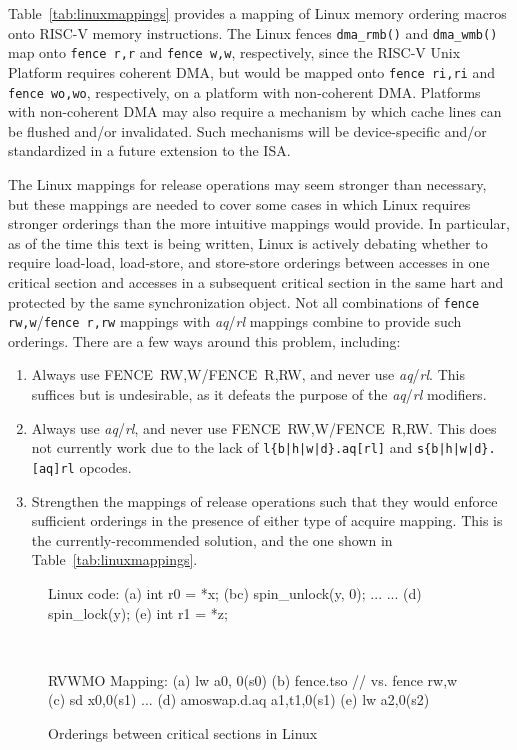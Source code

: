Table~\ref{tab:linuxmappings} provides a mapping of Linux memory ordering macros onto RISC-V memory instructions.
The Linux fences {\tt dma\_rmb()} and {\tt dma\_wmb()} map onto {\tt fence r,r} and {\tt fence w,w}, respectively, since the RISC-V Unix Platform requires coherent DMA, but would be mapped onto {\tt fence ri,ri} and {\tt fence wo,wo}, respectively, on a platform with non-coherent DMA.
Platforms with non-coherent DMA may also require a mechanism by which cache lines can be flushed and/or invalidated.
Such mechanisms will be device-specific and/or standardized in a future extension to the ISA.

The Linux mappings for release operations may seem stronger than necessary, but these mappings are needed to cover some cases in which Linux requires stronger orderings than the more intuitive mappings would provide.
In particular, as of the time this text is being written, Linux is actively debating whether to require load-load, load-store, and store-store orderings between accesses in one critical section and accesses in a subsequent critical section in the same hart and protected by the same synchronization object.
Not all combinations of {\tt fence rw,w}/{\tt fence r,rw} mappings with {\em aq}/{\em rl} mappings combine to provide such orderings.
There are a few ways around this problem, including:
\begin{enumerate}
  \item Always use FENCE~RW,W/FENCE~R,RW, and never use {\em aq}/{\em rl}.  This suffices but is undesirable, as it defeats the purpose of the {\em aq}/{\em rl} modifiers.
  \item Always use {\em aq}/{\em rl}, and never use FENCE~RW,W/FENCE~R,RW.  This does not currently work due to the lack of {\tt l\{b|h|w|d\}.aq[rl]} and {\tt s\{b|h|w|d\}.[aq]rl} opcodes.
  \item Strengthen the mappings of release operations such that they would enforce sufficient orderings in the presence of either type of acquire mapping.  This is the currently-recommended solution, and the one shown in Table~\ref{tab:linuxmappings}.
\end{enumerate}

\begin{figure}[h!]
  \centering\small
  \begin{verbbox}
Linux code:
(a)  int r0 = *x;
(bc) spin_unlock(y, 0);
     ...
     ...
(d)  spin_lock(y);
(e)  int r1 = *z;
  \end{verbbox}
  \theverbbox
  ~~~~~~~~~~
  \begin{verbbox}
RVWMO Mapping:
(a) lw           a0, 0(s0)
(b) fence.tso  // vs. fence rw,w
(c) sd           x0,0(s1)
    ...
(d) amoswap.d.aq a1,t1,0(s1)
(e) lw           a2,0(s2)
  \end{verbbox}
  \theverbbox
  \caption{Orderings between critical sections in Linux}
  \label{fig:litmus:lkmm_ll}
\end{figure}

